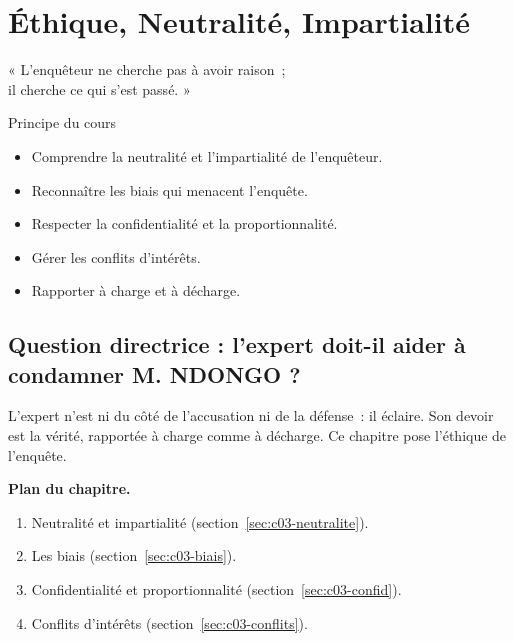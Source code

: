 
\chapter{Éthique, Neutralité, Impartialité}
\label{chap:ethique}

\epigraph{%
    « L'enquêteur ne cherche pas à avoir raison~;\\
    il cherche ce qui s'est passé. »%
}{Principe du cours}


\begin{boxobjectifs}
\begin{itemize}
    \item Comprendre la neutralité et l'impartialité de l'enquêteur.
    \item Reconnaître les biais qui menacent l'enquête.
    \item Respecter la confidentialité et la proportionnalité.
    \item Gérer les conflits d'intérêts.
    \item Rapporter à charge et à décharge.
\end{itemize}
\end{boxobjectifs}

\bigskip

\section*{Question directrice : l'expert doit-il aider à condamner M. NDONGO ?}

L'expert n'est ni du côté de l'accusation ni de la défense~: il éclaire. Son
devoir est la vérité, rapportée à charge comme à décharge. Ce chapitre pose
l'éthique de l'enquête.

\medskip
\textbf{Plan du chapitre.}
\begin{enumerate}
    \item Neutralité et impartialité (section~\ref{sec:c03-neutralite}).
    \item Les biais (section~\ref{sec:c03-biais}).
    \item Confidentialité et proportionnalité (section~\ref{sec:c03-confid}).
    \item Conflits d'intérêts (section~\ref{sec:c03-conflits}).
\end{enumerate}

